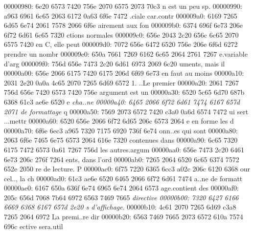 \begin{soluti
00000210: 6f6e 7d0a 2020 5c62 6567 696e 7b6c 7374  on}
\begin{lst
00000220: 6c69 7374 696e 677d 5b6c 616e 6775 6167  listing}[languag
00000230: 653d 6261 7368 5d0a 2020 2020 6769 7420  e=bash]
\begin{lst
00000330: 6c69 7374 696e 677d 5b6c 616e 6775 6167  listing}[languag
00000340: 653d 435d 0a23 696e 636c 7564 6520 3c73  e=C]
\begin{cente
000003e0: 727d 0a20 205c 736c 204f 6e20 7661 206d  r}
\begin{solu
00000490: 7469 6f6e 7d0a 2020 5c62 6567 696e 7b6c  tion}
\begin{l
000004a0: 7374 6c69 7374 696e 677d 5b6c 616e 6775  stlisting}[langu
000004b0: 6167 653d 6261 7368 5d0a 2020 2020 6364  age=bash]
\begin{so
00000540: 6c75 7469 6f6e 7d0a 2020 5c62 6567 696e  lution}
\begin{solution}
\begin{lstlis
00000630: 7469 6e67 7d5b 6c61 6e67 7561 6765 3d62  ting}[language=b
00000640: 6173 685d 0a20 2020 202e 2f65 7865 7263  ash]
\begin{center}
\begin{ce
00000880: 6e74 6572 7d0a 2020 5c66 626f 787b 7e5c  nter}
00000980: 6e20 6573 7420 756e 2070 6575 2073 70c3  n est un peu sp.
00000990: a963 6961 6c65 2063 6172 0a63 6f6e 7472  .ciale car.contr
000009a0: 6169 7265 6d65 6e74 2061 7578 2066 6f6e  airement aux fon
000009b0: 6374 696f 6e73 206e 6f72 6d61 6c65 7320  ctions normales 
000009c0: 656e 2043 2c20 656c 6c65 2070 6575 7420  en C, elle peut 
000009d0: 7072 656e 6472 6520 756e 206e 6f6d 6272  prendre un nombr
000009e0: 650a 7661 7269 6162 6c65 2064 2761 7267  e.variable d'arg
000009f0: 756d 656e 7473 2c20 6d61 6973 2069 6c20  uments, mais il 
00000a00: 656e 2066 6175 7420 6175 206d 6f69 6e73  en faut au moins
00000a10: 2031 2e20 0a0a 4c65 2070 7265 6d69 6572   1. ..Le premier
00000a20: 2061 7267 756d 656e 7420 6573 7420 756e   argument est un
00000a30: 6520 5c65 6d70 687b 6368 61c3 ae6e 6520  e \emph{cha..ne 
00000a40: 6465 2066 6f72 6d61 7474 6167 657d 2071  de formattage} q
00000a50: 7569 2073 6572 7420 c3a0 0a6d 6574 7472  ui sert ...mettr
00000a60: 6520 656e 2066 6f72 6d65 206c 6573 2064  e en forme les d
00000a70: 6f6e 6ec3 a965 7320 7175 6920 736f 6e74  onn..es qui sont
00000a80: 2063 6f6e 7465 6e75 6573 2064 616e 7320   contenues dans 
00000a90: 6c65 7320 6175 7472 6573 0a61 7267 756d  les autres.argum
00000aa0: 656e 7473 2c20 6461 6e73 206c 276f 7264  ents, dans l'ord
00000ab0: 7265 2064 6520 6c65 6374 7572 652e 2050  re de lecture. P
00000ac0: 6f75 7220 6365 6cc3 a02c 206c 6120 6368  our cel.., la ch
00000ad0: 61c3 ae6e 6520 6465 2066 6f72 6d61 7474  a..ne de formatt
00000ae0: 6167 650a 636f 6e74 6965 6e74 2064 6573  age.contient des
00000af0: 205c 656d 7068 7b64 6972 6563 7469 7665   \emph{directive
00000b00: 7320 6427 6166 6669 6368 6167 657d 2e20  s d'affichage}. 
00000b10: 4c61 2070 7265 6d69 c3a8 7265 2064 6972  La premi..re dir
00000b20: 6563 7469 7665 2073 6572 610a 7574 696c  ective sera.util

\end{ce
00000880: 6e74 6572 7d0a 2020 5c66 626f 787b 7e5c  nter}
\end{center}
\end{lstlis
00000630: 7469 6e67 7d5b 6c61 6e67 7561 6765 3d62  ting}
\end{solution}
\end{so
00000540: 6c75 7469 6f6e 7d0a 2020 5c62 6567 696e  lution}
\end{l
000004a0: 7374 6c69 7374 696e 677d 5b6c 616e 6775  stlisting}
\end{solu
00000490: 7469 6f6e 7d0a 2020 5c62 6567 696e 7b6c  tion}
\end{cente
000003e0: 727d 0a20 205c 736c 204f 6e20 7661 206d  r}
\end{lst
00000330: 6c69 7374 696e 677d 5b6c 616e 6775 6167  listing}
\end{lst
00000220: 6c69 7374 696e 677d 5b6c 616e 6775 6167  listing}
\end{soluti
00000210: 6f6e 7d0a 2020 5c62 6567 696e 7b6c 7374  on}
